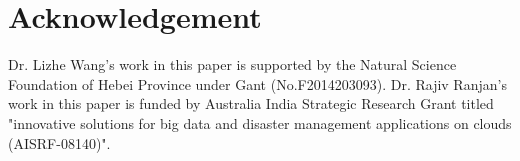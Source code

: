 \documentclass[journal]{IEEEtran}
\begin{document}
\section{Acknowledgement}
Dr. Lizhe Wang's work in this paper is supported by  the Natural Science Foundation of Hebei Province under Gant (No.F2014203093).
Dr. Rajiv Ranjan's work in this paper is funded by Australia India Strategic Research Grant titled "innovative solutions for big data and disaster management applications on clouds (AISRF-08140)".



\end{document}
